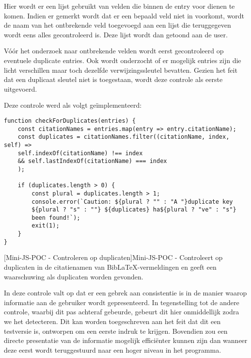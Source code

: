 Hier wordt er een lijst gebruikt van velden die binnen de entry voor dienen te komen. Indien er gemerkt wordt dat er een bepaald veld niet in voorkomt, wordt de naam van het ontbrekende veld toegevoegd aan een lijst die teruggegeven wordt eens alles gecontroleerd is. Deze lijst wordt dan getoond aan de user.

Vóór het onderzoek naar ontbrekende velden wordt eerst gecontroleerd op eventuele duplicate entries. Ook wordt onderzocht of er mogelijk entries zijn die licht verschillen maar toch dezelfde verwijzingssleutel bevatten. Gezien het feit dat een duplicaat sleutel niet is toegestaan, wordt deze controle als eerste uitgevoerd.

\begin{minipage}{\pdfpagewidth}
Deze controle werd als volgt geïmplementeerd:

\begin{verbatim}
function checkForDuplicates(entries) {
    const citationNames = entries.map(entry => entry.citationName);
    const duplicates = citationNames.filter((citationName, index, self) => 
    self.indexOf(citationName) !== index 
    && self.lastIndexOf(citationName) === index
    );

    if (duplicates.length > 0) {
        const plural = duplicates.length > 1;
        console.error(`Caution: ${plural ? "" : "A "}duplicate key
        ${plural ? "s" : ""} ${duplicates} ha${plural ? "ve" : "s"} 
        been found!`);
        exit(1);
    }
}
\end{verbatim}
[Mini-\acrshort{JS}-\acrshort{POC} - Controleren op duplicaten]{Mini-\acrshort{JS}-\acrshort{POC} - Controleert op duplicaten in de citatienamen van BibLaTeX-vermeldingen en geeft een waarschuwing als duplicaten worden gevonden. \label{lst:minipocjs_check_duplicates}}
\end{minipage}
In deze controle valt op dat er een gebrek aan consistentie is in de manier waarop informatie aan de gebruiker wordt gepresenteerd. In tegenstelling tot de andere controle, waarbij dit pas achteraf gebeurde, gebeurt dit hier onmiddellijk zodra we het detecteren. Dit kan worden toegeschreven aan het feit dat dit een testversie is, ontworpen om een eerste indruk te krijgen. Bovendien zou een directe presentatie van de informatie mogelijk efficiënter kunnen zijn dan wanneer deze eerst wordt teruggestuurd naar een hoger niveau in het programma.

